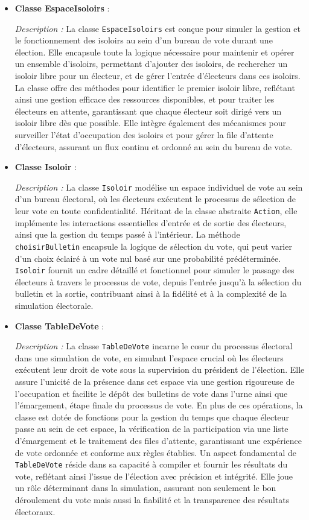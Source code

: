 \documentclass[12pt]{article} %
\begin{document}
\begin{itemize}[leftmargin=*,label={}]
	\item \textbf{Classe EspaceIsoloirs} :
	
	\textit{Description :} La classe \texttt{EspaceIsoloirs} est conçue pour simuler la gestion et le fonctionnement des isoloirs au sein d'un bureau de vote durant une élection. Elle encapsule toute la logique nécessaire pour maintenir et opérer un ensemble d'isoloirs, permettant d'ajouter des isoloirs, de rechercher un isoloir libre pour un électeur, et de gérer l'entrée d'électeurs dans ces isoloirs. La classe offre des méthodes pour identifier le premier isoloir libre, reflétant ainsi une gestion efficace des ressources disponibles, et pour traiter les électeurs en attente, garantissant que chaque électeur soit dirigé vers un isoloir libre dès que possible. Elle intègre également des mécanismes pour surveiller l'état d'occupation des isoloirs et pour gérer la file d'attente d'électeurs, assurant un flux continu et ordonné au sein du bureau de vote.
	
	\item \textbf{Classe Isoloir} :
	
	\textit{Description :} La classe \texttt{Isoloir} modélise un espace individuel de vote au sein d'un bureau électoral, où les électeurs exécutent le processus de sélection de leur vote en toute confidentialité. Héritant de la classe abstraite \texttt{Action}, elle implémente les interactions essentielles d'entrée et de sortie des électeurs, ainsi que la gestion du temps passé à l'intérieur.  La méthode \texttt{choisirBulletin} encapsule la logique de sélection du vote, qui peut varier d'un choix éclairé à un vote nul basé sur une probabilité prédéterminée. \texttt{Isoloir} fournit un cadre détaillé et fonctionnel pour simuler le passage des électeurs à travers le processus de vote, depuis l'entrée jusqu'à la sélection du bulletin et la sortie, contribuant ainsi à la fidélité et à la complexité de la simulation électorale.
	
	\item \textbf{Classe TableDeVote} :
	
	\textit{Description :} La classe \texttt{TableDeVote} incarne le cœur du processus électoral dans une simulation de vote, en simulant l'espace crucial où les électeurs exécutent leur droit de vote sous la supervision du président de l'élection. Elle assure l'unicité de la présence dans cet espace via une gestion rigoureuse de l'occupation et facilite le dépôt des bulletins de vote dans l'urne ainsi que l'émargement, étape finale du processus de vote. En plus de ces opérations, la classe est dotée de fonctions pour la gestion du temps que chaque électeur passe au sein de cet espace, la vérification de la participation via une liste d'émargement et le traitement des files d'attente, garantissant une expérience de vote ordonnée et conforme aux règles établies. Un aspect fondamental de \texttt{TableDeVote} réside dans sa capacité à compiler et fournir les résultats du vote, reflétant ainsi l'issue de l'élection avec précision et intégrité. Elle joue un rôle déterminant dans la simulation, assurant non seulement le bon déroulement du vote mais aussi la fiabilité et la transparence des résultats électoraux.
	

\end{itemize}
\end{document}
